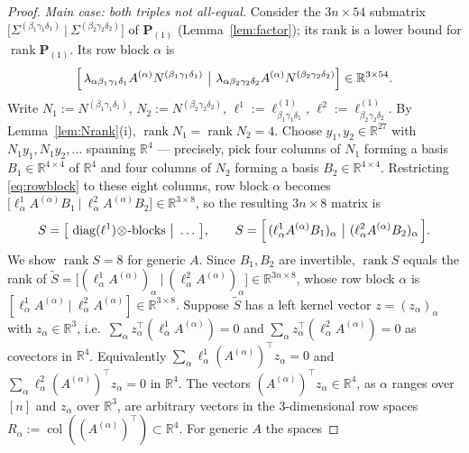 \documentclass[12pt]{article}
\DeclareMathOperator{\diag}{diag}
\DeclareMathOperator{\rank}{rank}
\DeclareMathOperator{\col}{col}
\newcommand{\bR}{\mathbb{R}}
\theoremstyle{definition}
\begin{document}
\begin{proof}
\emph{Main case: both triples not all-equal.}
Consider the $3n\times54$ submatrix
$\bigl[\Sigma^{(\beta_1\gamma_1\delta_1)}\ \big|\ \Sigma^{(\beta_2\gamma_2\delta_2)}\bigr]$
of $\mathbf P_{(1)}$ (Lemma~\ref{lem:factor}); its rank is a lower bound for
$\rank\mathbf P_{(1)}$.  Its row block $\alpha$ is
\begin{equation}\label{eq:rowblock}
\Bigl[\,\lambda_{\alpha\beta_1\gamma_1\delta_1}A^{(\alpha)}N^{(\beta_1\gamma_1\delta_1)}
\ \big|\ \lambda_{\alpha\beta_2\gamma_2\delta_2}A^{(\alpha)}N^{(\beta_2\gamma_2\delta_2)}\Bigr]
\in\bR^{3\times54}.
\end{equation}
Write $N_1:=N^{(\beta_1\gamma_1\delta_1)}$, $N_2:=N^{(\beta_2\gamma_2\delta_2)}$,
$\ell^{1}:=\ell^{(1)}_{\beta_1\gamma_1\delta_1}$,
$\ell^{2}:=\ell^{(1)}_{\beta_2\gamma_2\delta_2}$.
By Lemma~\ref{lem:Nrank}(i), $\rank N_1=\rank N_2=4$.  Choose $y_1,y_2\in\bR^{27}$
with $N_1y_1, N_1y_2,\dots$ spanning $\bR^4$ — precisely, pick four columns of $N_1$
forming a basis $B_1\in\bR^{4\times4}$ of $\bR^4$ and four columns of $N_2$ forming
a basis $B_2\in\bR^{4\times4}$.  Restricting \eqref{eq:rowblock} to these eight
columns, row block $\alpha$ becomes
$\bigl[\ell^{1}_\alpha A^{(\alpha)}B_1\ \big|\ \ell^{2}_\alpha A^{(\alpha)}B_2\bigr]
\in\bR^{3\times8}$,
so the resulting $3n\times8$ matrix is
\begin{equation}\label{eq:S8}
S=\bigl[\ \diag(\ell^{1})\!\otimes\!\text{-blocks}\ \big|\ \dots\ \bigr],
\qquad
S=\Bigl[\,(\ell^{1}_\alpha A^{(\alpha)}B_1)_\alpha\ \big|\ (\ell^{2}_\alpha A^{(\alpha)}B_2)_\alpha\,\Bigr].
\end{equation}
We show $\rank S=8$ for generic $A$.  Since $B_1,B_2$ are invertible, $\rank S$
equals the rank of
$\widetilde S=\bigl[(\ell^{1}_\alpha A^{(\alpha)})_\alpha\ \big|\ (\ell^{2}_\alpha A^{(\alpha)})_\alpha\bigr]\in\bR^{3n\times8}$,
whose row block $\alpha$ is $[\ell^1_\alpha A^{(\alpha)}\ |\ \ell^2_\alpha A^{(\alpha)}]\in\bR^{3\times8}$.
Suppose $\widetilde S$ has a left kernel vector $z=(z_\alpha)_\alpha$ with
$z_\alpha\in\bR^3$, i.e.\ $\sum_\alpha z_\alpha^\top(\ell^1_\alpha A^{(\alpha)})=0$
and $\sum_\alpha z_\alpha^\top(\ell^2_\alpha A^{(\alpha)})=0$ as covectors in
$\bR^4$.  Equivalently $\sum_\alpha \ell^1_\alpha (A^{(\alpha)})^\top z_\alpha=0$ and
$\sum_\alpha \ell^2_\alpha (A^{(\alpha)})^\top z_\alpha=0$ in $\bR^4$.  The vectors
$(A^{(\alpha)})^\top z_\alpha\in\bR^4$, as $\alpha$ ranges over $[n]$ and $z_\alpha$
over $\bR^3$, are arbitrary vectors in the $3$-dimensional row spaces
$R_\alpha:=\col((A^{(\alpha)})^\top)\subset\bR^4$.  For generic $A$ the spaces

\end{proof}
\end{document}
